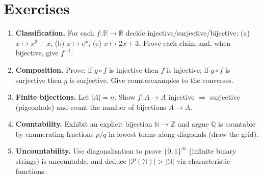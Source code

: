 \section{Exercises}
\label{sec:ch03-exercises}
\begin{enumerate}[label=E3.\arabic*, leftmargin=*, itemsep=0.6em]
\item \textbf{Classification.} For each $f:\mathbb{R}\to\mathbb{R}$ decide injective/surjective/bijective: (a) $x\mapsto x^3- x$, (b) $x\mapsto e^x$, (c) $x\mapsto 2x+3$. Prove each claim and, when bijective, give $f^{-1}$.
\item \textbf{Composition.} Prove: if $g\circ f$ is injective then $f$ is injective; if $g\circ f$ is surjective then $g$ is surjective. Give counterexamples to the converses.
\item \textbf{Finite bijections.} Let $|A|=n$. Show $f:A\to A$ injective $\Rightarrow$ surjective (pigeonhole) and count the number of bijections $A\to A$.
\item \textbf{Countability.} Exhibit an explicit bijection $\mathbb{N}\to\mathbb{Z}$ and argue $\mathbb{Q}$ is countable by enumerating fractions $p/q$ in lowest terms along diagonals (draw the grid).
\item \textbf{Uncountability.} Use diagonalisation to prove $\{0,1\}^\infty$ (infinite binary strings) is uncountable, and deduce $|\mathcal{P}(\mathbb{N})|>|\mathbb{N}|$ via characteristic functions.
\end{enumerate}
